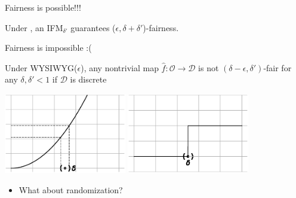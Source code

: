\documentclass{beamer}
\newcommand{\cO}{\mathcal{O}}
\newcommand{\cC}{\mathcal{C}}
\newcommand{\cD}{\mathcal{D}}
\begin{document}
\begin{frame}{Fairness is possible!!!}

\begin{tcolorbox}
\begin{theorem}
Under {\color{red}{WYSIWYG}}, an {\color{blue} IFM$_{\delta'}$}  guarantees ($\epsilon, \delta+\delta'$)-{\color{green}fairness}.
\end{theorem}
\end{tcolorbox}
\begin{center}
\end{center}


\end{frame}

\begin{frame}{Fairness is impossible :(}

\begin{tcolorbox}
\begin{theorem}
Under WYSIWYG($\epsilon$), any nontrivial map $\hat f:\cO\to\cD$ is not $(\delta-\epsilon, \delta')$-fair for any $\delta,\delta'<1$ if $\cD$ is discrete
\end{theorem}

\end{tcolorbox}
\pause
\begin{center}
\includegraphics[width=0.4\textwidth]{conts.eps} \includegraphics[width=0.4\textwidth]{disconts.eps} 
\end{center}

  \begin{itemize}
  \item{
    What about randomization?
  }
  \end{itemize}
  
\end{frame}
\end{document}
